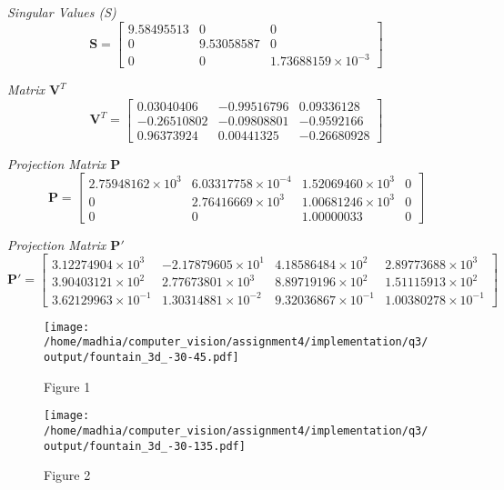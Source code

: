 \documentclass{article}
\begin{document}
\textit{Singular Values (S)}
\[
\mathbf{S} = \begin{bmatrix}
9.58495513 & 0 & 0 \\ 
0 & 9.53058587 & 0 \\ 
0 & 0 & 1.73688159 \times 10^{-3} 
\end{bmatrix}
\]

\textit{Matrix $\mathbf{V}^T$}
\[
\mathbf{V}^T = \begin{bmatrix}
0.03040406 & -0.99516796 & 0.09336128 \\ 
-0.26510802 & -0.09808801 & -0.9592166 \\ 
0.96373924 & 0.00441325 & -0.26680928 
\end{bmatrix}
\]

\textit{Projection Matrix $\mathbf{P}$}
\[
\mathbf{P} = \begin{bmatrix}
2.75948162 \times 10^{3} & 6.03317758 \times 10^{-4} & 1.52069460 \times 10^{3} & 0 \\ 
0 & 2.76416669 \times 10^{3} & 1.00681246 \times 10^{3} & 0 \\ 
0 & 0 & 1.00000033 & 0 
\end{bmatrix}
\]

\textit{Projection Matrix $\mathbf{P}'$}
\[
\mathbf{P}' = \begin{bmatrix}
3.12274904 \times 10^{3} & -2.17879605 \times 10^{1} & 4.18586484 \times 10^{2} & 2.89773688 \times 10^{3} \\ 
3.90403121 \times 10^{2} & 2.77673801 \times 10^{3} & 8.89719196 \times 10^{2} & 1.51115913 \times 10^{2} \\ 
3.62129963 \times 10^{-1} & 1.30314881 \times 10^{-2} & 9.32036867 \times 10^{-1} & 1.00380278 \times 10^{-1} 
\end{bmatrix}
\]

\begin{figure}[h!]
    \centering
    \begin{minipage}{0.4\textwidth}
        \centering
        \texttt{[image: /home/madhia/computer\_vision/assignment4/implementation/q3/output/fountain\_3d\_-30-45.pdf]}
        \caption{Figure 1}
    \end{minipage}%
    \begin{minipage}{0.4\textwidth}
        \centering
        \texttt{[image: /home/madhia/computer\_vision/assignment4/implementation/q3/output/fountain\_3d\_-30-135.pdf]}
        \caption{Figure 2}
    \end{minipage}%
\end{figure}
\end{document}
